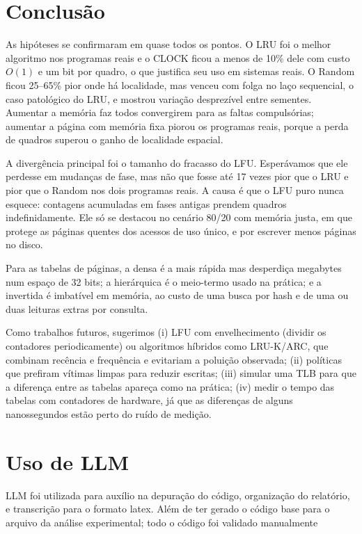\documentclass[11pt,a4paper]{article}
\begin{document}
\section{Conclusão}

As hipóteses se confirmaram em quase todos os pontos. O LRU foi o
melhor algoritmo nos programas reais e o CLOCK ficou a menos de 10\%
dele com custo $O(1)$ e um bit por quadro, o que justifica seu uso em
sistemas reais. O Random ficou 25--65\% pior onde há localidade, mas
venceu com folga no laço sequencial, o caso patológico do LRU, e mostrou
variação desprezível entre sementes. Aumentar a memória faz todos
convergirem para as faltas compulsórias; aumentar a página com memória
fixa piorou os programas reais, porque a perda de quadros superou o
ganho de localidade espacial.

A divergência principal foi o tamanho do fracasso do LFU. Esperávamos
que ele perdesse em mudanças de fase, mas não que fosse até 17 vezes pior
que o LRU e pior que o Random nos dois programas reais. A causa é que o
LFU puro nunca esquece: contagens acumuladas em fases antigas prendem
quadros indefinidamente. Ele só se destacou no cenário 80/20 com
memória justa, em que protege as páginas quentes dos acessos de uso
único, e por escrever menos páginas no disco.

Para as tabelas de páginas, a densa é a mais rápida mas desperdiça
megabytes num espaço de 32 bits; a hierárquica é o meio-termo usado na
prática; e a invertida é imbatível em memória, ao custo de uma busca por
hash e de uma ou duas leituras extras por consulta.

Como trabalhos futuros, sugerimos (i) LFU com envelhecimento (dividir os
contadores periodicamente) ou algoritmos híbridos como LRU-K/ARC, que
combinam recência e frequência e evitariam a poluição observada;
(ii) políticas que prefiram vítimas limpas para reduzir escritas;
(iii) simular uma TLB para que a diferença entre as tabelas apareça
como na prática; (iv) medir o tempo das tabelas com contadores de
hardware, já que as diferenças de alguns nanossegundos estão perto do
ruído de medição.

\section{Uso de LLM}
LLM foi utilizada para auxílio na depuração do código, organização do relatório, e transcrição para o formato latex. Além de ter gerado o código base para o arquivo da análise experimental; todo o código foi validado manualmente
\end{document}
